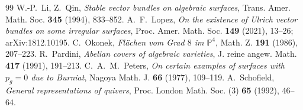 \documentclass[10pt,a4paper]{amsart}
\newcommand{\PP}{\mathbb{P}}
\begin{document}
\begin{thebibliography}{99}
 W.-P.~Li, Z.~Qin, \emph{Stable vector bundles on algebraic surfaces}, Trans. Amer. Math. Soc. \textbf{345} (1994), 833--852.
 A.~F.~Lopez, \emph{On the existence of Ulrich vector bundles on some irregular surfaces}, Proc. Amer. Math. Soc. \textbf{149} (2021), 13--26; arXiv:1812.10195.
 C.~Okonek, \emph{Fl\"achen vom Grad $8$ im $\PP^4$}, Math. Z. \textbf{191} (1986), 207--223.
 R.~Pardini, \emph{Abelian covers of algebraic varieties}, J. reine angew. Math. \textbf{417} (1991), 191--213.
 C.~A.~M.~Peters, \emph{On certain examples of surfaces with $p_g=0$ due to Burniat}, Nagoya Math. J. \textbf{66} (1977), 109--119.
 A.~Schofield, \emph{General representations of quivers}, Proc. London Math. Soc. (3) \textbf{65} (1992), 46--64.
\end{thebibliography}
\end{document}
